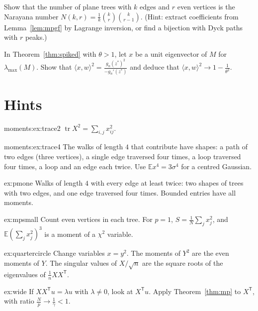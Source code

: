 \begin{exercise}[$\star\star\star$]\label{ex:narayana}
Show that the number of plane trees with $k$ edges and $r$ even vertices is the Narayana number $N(k,r)=\frac1k\binom kr\binom k{r-1}$. (Hint: extract coefficients from Lemma~\ref{lem:mpgf} by Lagrange inversion, or find a bijection with
Dyck paths with $r$ peaks.)
\end{exercise}

\begin{exercise}[$\star\star\star$]\label{ex:overlap}
In Theorem~\ref{thm:spiked} with $\theta>1$, let $x$ be a unit eigenvector of $M$ for $\lambda_{\max}(M)$. Show that $\langle x,w\rangle^2=\frac{g_n(z^*)^2}{-g_n'(z^*)}$ and deduce that $\langle x,w\rangle^2\to1-\frac1{\theta^2}$.
\end{exercise}

\section{Hints}
\begin{hint}{moments:ex:trace2}
$\operatorname{tr}X^2=\sum_{i,j}x_{ij}^2$.
\end{hint}
\begin{hint}{moments:ex:trace4}
The walks of length $4$ that contribute have shapes: a path of two edges (three vertices), a single edge traversed four times, a loop traversed four times, a loop and an edge each twice.
Use $\mathbb Ex^4=3\sigma^4$ for a centred Gaussian.
\end{hint}

\begin{hint}{ex:pmone}
Walks of length $4$ with every edge at least twice: two shapes of trees with two edges, and one edge traversed four times. Bounded entries have all moments.
\end{hint}

\begin{hint}{ex:mpsmall}
Count even vertices in each tree. For $p=1$, $S=\frac1N\sum_jx_j^2$, and $\mathbb E(\sum_jx_j^2)^3$ is a moment of a $\chi^2$ variable.
\end{hint}

\begin{hint}{ex:quartercircle}
Change variables $x=y^2$. The moments of $Y^2$ are the even moments of $Y$. The singular values of $X/\sqrt n$ are the square roots of the eigenvalues of $\frac1nXX^{\mathsf T}$.
\end{hint}

\begin{hint}{ex:wide}
If $XX^{\mathsf T}u=\lambda u$ with $\lambda\ne0$, look at $X^{\mathsf T}u$. Apply Theorem~\ref{thm:mp} to $X^{\mathsf T}$, with ratio $\frac Np\to\frac1\gamma<1$.
\end{hint}

